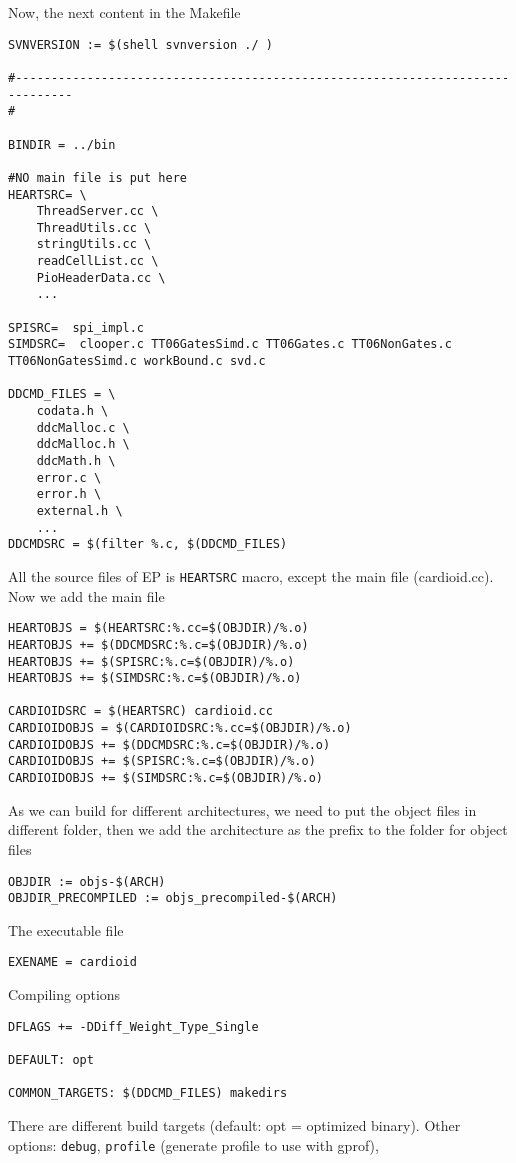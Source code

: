 Now, the next content in the Makefile
 {\small \begin{verbatim}
SVNVERSION := $(shell svnversion ./ )

#------------------------------------------------------------------------------
#

BINDIR = ../bin

#NO main file is put here
HEARTSRC= \
    ThreadServer.cc \
    ThreadUtils.cc \
    stringUtils.cc \
    readCellList.cc \
    PioHeaderData.cc \
    ...

SPISRC=  spi_impl.c
SIMDSRC=  clooper.c TT06GatesSimd.c TT06Gates.c TT06NonGates.c TT06NonGatesSimd.c workBound.c svd.c

DDCMD_FILES = \
    codata.h \
    ddcMalloc.c \
    ddcMalloc.h \
    ddcMath.h \
    error.c \
    error.h \
    external.h \
    ...
DDCMDSRC = $(filter %.c, $(DDCMD_FILES)

\end{verbatim} }
All the source files of EP is \verb!HEARTSRC! macro, except the main file
(cardioid.cc). Now we add the main file
\begin{verbatim}
HEARTOBJS = $(HEARTSRC:%.cc=$(OBJDIR)/%.o)
HEARTOBJS += $(DDCMDSRC:%.c=$(OBJDIR)/%.o)
HEARTOBJS += $(SPISRC:%.c=$(OBJDIR)/%.o)
HEARTOBJS += $(SIMDSRC:%.c=$(OBJDIR)/%.o)

CARDIOIDSRC = $(HEARTSRC) cardioid.cc
CARDIOIDOBJS = $(CARDIOIDSRC:%.cc=$(OBJDIR)/%.o)
CARDIOIDOBJS += $(DDCMDSRC:%.c=$(OBJDIR)/%.o)
CARDIOIDOBJS += $(SPISRC:%.c=$(OBJDIR)/%.o)
CARDIOIDOBJS += $(SIMDSRC:%.c=$(OBJDIR)/%.o)
\end{verbatim}
As we can build for different architectures, we need to put the object files in
different folder, then we add the architecture as the prefix to the folder for
object files
\begin{verbatim}
OBJDIR := objs-$(ARCH)
OBJDIR_PRECOMPILED := objs_precompiled-$(ARCH)
\end{verbatim}
The executable file
\begin{verbatim}
EXENAME = cardioid
\end{verbatim}
Compiling options 
\begin{verbatim}
DFLAGS += -DDiff_Weight_Type_Single

DEFAULT: opt

COMMON_TARGETS: $(DDCMD_FILES) makedirs
\end{verbatim}
There are different build targets (default: opt = optimized binary). Other
options: \verb!debug!, \verb!profile! (generate profile to use with gprof),
